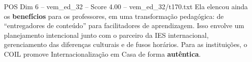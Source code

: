 \begin{textsample}{POS Dim 6 – vem\_ed\_32 – Score 4.00 – vem\_ed\_32/t170.txt}
Ela elencou ainda os \textbf{benefícios} para os professores, em uma transformação pedagógica: de “entregadores de conteúdo” para facilitadores de aprendizagem.
Isso envolve um planejamento intencional junto com o parceiro da IES internacional, gerenciamento das diferenças culturais e de fusos horários.
Para as instituições, o COIL promove Internacionalização em Casa de forma \textbf{autêntica}.

\end{textsample}
